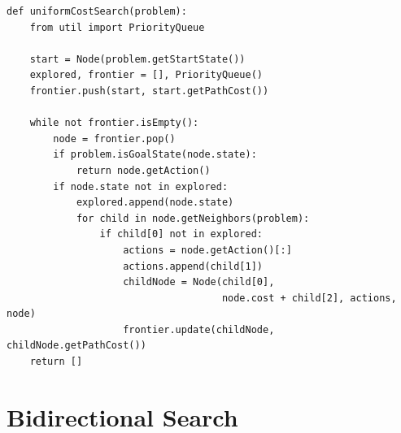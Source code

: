 \documentclass[a4paper,12pt]{report}
\begin{document}
\begin{Verbatim}[frame=single]
def uniformCostSearch(problem):
    from util import PriorityQueue

    start = Node(problem.getStartState())
    explored, frontier = [], PriorityQueue()
    frontier.push(start, start.getPathCost())

    while not frontier.isEmpty():
        node = frontier.pop()
        if problem.isGoalState(node.state):
            return node.getAction()
        if node.state not in explored:
            explored.append(node.state)
            for child in node.getNeighbors(problem):
                if child[0] not in explored:
                    actions = node.getAction()[:]
                    actions.append(child[1])
                    childNode = Node(child[0],
                                     node.cost + child[2], actions, node)
                    frontier.update(childNode, childNode.getPathCost())
    return []
\end{Verbatim}

\section{Bidirectional Search}
\end{document}
